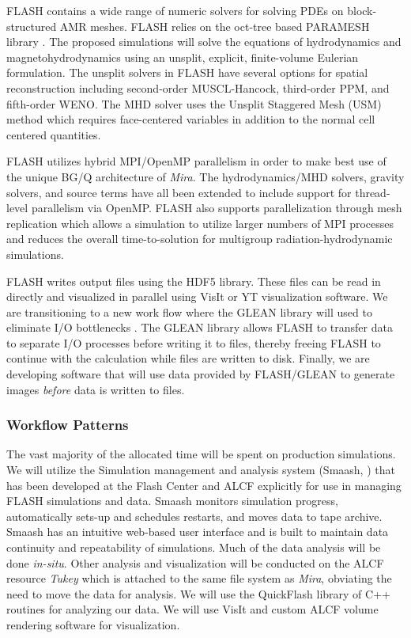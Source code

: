 FLASH contains a wide range of numeric solvers for solving
PDEs on block-structured AMR meshes. FLASH relies on the oct-tree
based PARAMESH library \citep{MacNeice:2000fc}. The proposed
simulations will solve the equations of hydrodynamics and
magnetohydrodynamics using an unsplit, explicit, finite-volume
Eulerian formulation. The unsplit solvers in FLASH have several
options for spatial reconstruction including second-order
MUSCL-Hancock, third-order PPM, and fifth-order WENO. The MHD solver
uses the Unsplit Staggered Mesh (USM) method which requires
face-centered variables in addition to the normal cell centered
quantities.

FLASH utilizes hybrid MPI/OpenMP parallelism in order to make best use
of the unique BG/Q architecture of {\it Mira}. The hydrodynamics/MHD
solvers, gravity solvers, and source terms have all been extended to
include support for thread-level parallelism via OpenMP. FLASH also
supports parallelization through mesh replication which allows a
simulation to utilize larger numbers of MPI processes and reduces the
overall time-to-solution for multigroup radiation-hydrodynamic
simulations.


FLASH writes output files using the HDF5 library. These files can be
read in directly and visualized in parallel using VisIt or YT
visualization software. We are transitioning to a new work flow where
the GLEAN library will used to eliminate I/O bottlenecks
\cite{vishwanath2011}. The GLEAN library allows FLASH to transfer data
to separate I/O processes before writing it to files, thereby freeing
FLASH to continue with the calculation while files are written to
disk. Finally, we are developing software that will use data provided
by FLASH/GLEAN to generate images \textsl{before} data is written to
files.


\subsubsection{Workflow Patterns}

The vast majority of the allocated time will be spent on production
simulations. We will utilize the Simulation management and analysis
system (Smaash, \citep{Hudson:2011tp}) that has been developed at the
Flash Center and ALCF explicitly for use in managing FLASH simulations
and data. Smaash monitors simulation progress, automatically sets-up
and schedules restarts, and moves data to tape archive. Smaash has an
intuitive web-based user interface and is built to maintain data
continuity and repeatability of simulations. Much of the data analysis
will be done {\it in-situ}.  Other analysis and visualization will be
conducted on the ALCF resource {\it Tukey} which is attached to the
same file system as {\it Mira}, obviating the need to move the data for
analysis.  We will use the QuickFlash library of C++ routines for
analyzing our data.  We will use VisIt and custom ALCF volume
rendering software for visualization.

